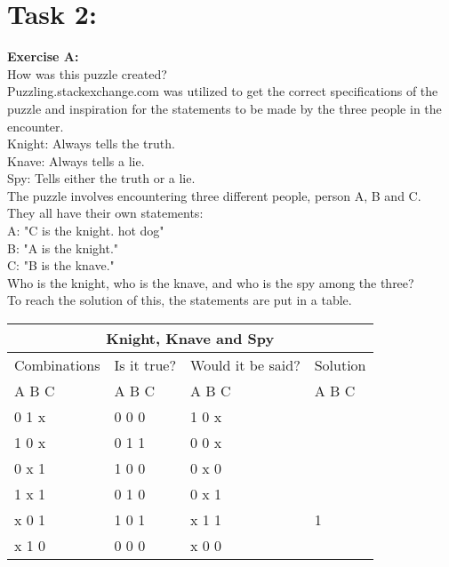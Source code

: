 \documentclass[11pt]{amsart}
\begin{document}
\section{Task 2:}

\textbf{Exercise A:}\\

How was this puzzle created? \\
	Puzzling.stackexchange.com was utilized to get the correct specifications of the puzzle
	and inspiration for the statements to be made by the three people in the encounter. \\

Knight: Always tells the truth.\\
Knave: 	Always tells a lie.\\
Spy: 		Tells either the truth or a lie. \\

The puzzle involves encountering three different people, person A, B and C. \\

They all have their own statements: \\

	A: "C is the knight. hot dog"\\
	B: "A is the knight."\\
	C: "B is the knave." \\

Who is the knight, who is the knave, and who is the spy among the three? \\

To reach the solution of this, the statements are put in a table. \\
\begin{tabular}{ |p{3cm}||p{3cm}|p{3cm}|p{3cm}|  }
 \hline
 \multicolumn{4}{|c|}{Knight, Knave and Spy} \\
 \hline
 Combinations & Is it true? & Would it be said? & Solution  \\ A  B  C   &   A  B  C  &   A  B  C & A  B  C \\
 \hline
	0   1   x  	& 0	0	0   & 1 0 x &  \\
	1   0   x		& 0	1	1  	& 0 0 x &  \\
	0   x   1 	&	1	0	0 	& 0 x 0 &  \\
	1   x   1  	&	0	1	0 	& 0 x 1 &  \\
	x   0   1		& 1	0	1  	& x 1 1 & 1\\
	x   1   0		& 0	0	0  	& x 0 0 &  \\
 \hline
\end{tabular}
\end{document}
